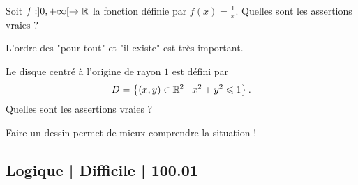 \begin{question}

Soit $f : ]0,+\infty[ \to \mathbb{R}$ la fonction définie par $f(x) = \frac{1}{x}$. Quelles sont les assertions vraies ?
\begin{answers}
    \good{$\forall x \in ]0,+\infty[ \quad \exists y \in \Rr \qquad y = f(x)$}

    \bad{$\exists x \in ]0,+\infty[ \quad \forall y \in \Rr \qquad y = f(x)$} 
    
    \good{$\exists x \in ]0,+\infty[ \quad \exists y \in \Rr \qquad y = f(x)$}

    \bad{$\forall x \in ]0,+\infty[ \quad \forall y \in \Rr \qquad y = f(x)$}
\end{answers}
\begin{explanations}
L'ordre des "pour tout" et "il existe" est très important.
\end{explanations}
\end{question}


\begin{question}

Le disque centré à l'origine de rayon $1$ est défini par 
$$D = \left\{ (x,y) \in \mathbb{R}^2 \mid x^2+y^2 \leqslant 1\right\}.$$
Quelles sont les assertions vraies ?
\begin{answers}
    


\end{answers}
\begin{explanations}
Faire un dessin permet de mieux comprendre la situation !
\end{explanations}
\end{question}



\subsection{Logique | Difficile | 100.01}


